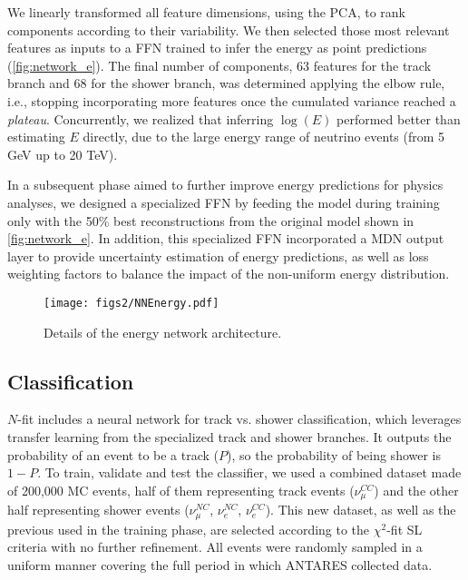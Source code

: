 We linearly transformed all feature dimensions, using the PCA, to rank components according to their variability. We then selected those most relevant features as inputs to a FFN trained to infer the energy as point predictions (\autoref{fig:network_e}). The final number of components, 63 features for the track branch and 68 for the shower branch, was determined applying the elbow rule, i.e., stopping incorporating more features once the cumulated variance reached a \textit{plateau}. Concurrently, we realized that inferring $\log (E)$ performed better than estimating $E$ directly, due to the large energy range of neutrino events (from 5 GeV up to 20 TeV).

In a subsequent phase aimed to further improve energy predictions for physics analyses, we designed a specialized FFN by feeding the model during training only with the 50\% best reconstructions from the original model shown in \autoref{fig:network_e}. In addition, this specialized FFN incorporated a MDN output layer to provide uncertainty estimation of energy predictions, as well as loss weighting factors to balance the impact of the non-uniform energy distribution.

\begin{figure}[htbp]
	\centering
	\texttt{[image: figs2/NNEnergy.pdf]}
	\caption{\label{fig:network_e}Details of the energy network architecture.}
\end{figure}

\subsection{Classification}
\label{subsec:class}

$N$-fit includes a neural network for track vs. shower classification, which leverages transfer learning from the specialized track and shower branches. It outputs the probability of an event to be a track ($P$), so the probability of being shower is $1-P$. To train, validate and test the classifier, we used a combined dataset made of 200,000 MC events, half of them representing track events ($\nu_\mu^{CC}$) and the other half representing shower events ($\nu_\mu^{NC}$, $\nu_e^{NC}$, $\nu_e^{CC}$). This new dataset, as well as the previous used in the training phase, are selected according to the $\chi^2$-fit SL criteria with no further refinement. All events were randomly sampled in a uniform manner covering the full period in which ANTARES collected data.

